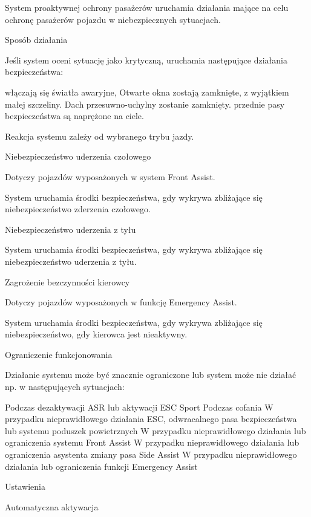 System proaktywnej ochrony pasażerów uruchamia działania mające na celu ochronę pasażerów pojazdu w niebezpiecznych sytuacjach.

Sposób działania

Jeśli system oceni sytuację jako krytyczną, uruchamia następujące działania bezpieczeństwa:
\begin{itemizeTriangle}
	\itemTriangle włączają się światła awaryjne,
	\itemTriangle Otwarte okna zostają zamknięte, z wyjątkiem małej szczeliny.
	\itemTriangle Dach przesuwno-uchylny zostanie zamknięty.
	\itemTriangle przednie pasy bezpieczeństwa są naprężone na ciele.
\end{itemizeTriangle}
Reakcja systemu zależy od wybranego trybu jazdy.

Niebezpieczeństwo uderzenia czołowego

Dotyczy pojazdów wyposażonych w system Front Assist.

System uruchamia środki bezpieczeństwa, gdy wykrywa zbliżające się niebezpieczeństwo zderzenia czołowego.

Niebezpieczeństwo uderzenia z tyłu

System uruchamia środki bezpieczeństwa, gdy wykrywa zbliżające się niebezpieczeństwo uderzenia z tyłu.

Zagrożenie bezczynności kierowcy

Dotyczy pojazdów wyposażonych w funkcję Emergency Assist.

System uruchamia środki bezpieczeństwa, gdy wykrywa zbliżające się niebezpieczeństwo, gdy kierowca jest nieaktywny.

Ograniczenie funkcjonowania

Działanie systemu może być znacznie ograniczone lub system może nie działać np. w następujących sytuacjach:
\begin{itemizeTriangle}
	\itemTriangle Podczas dezaktywacji ASR lub aktywacji ESC Sport
	\itemTriangle Podczas cofania
	\itemTriangle W przypadku nieprawidłowego działania ESC, odwracalnego pasa bezpieczeństwa lub systemu poduszek powietrznych
	\itemTriangle W przypadku nieprawidłowego działania lub ograniczenia systemu Front Assist
	\itemTriangle W przypadku nieprawidłowego działania lub ograniczenia asystenta zmiany pasa Side Assist
	\itemTriangle W przypadku nieprawidłowego działania lub ograniczenia funkcji Emergency Assist
\end{itemizeTriangle}

Ustawienia

Automatyczna aktywacja

